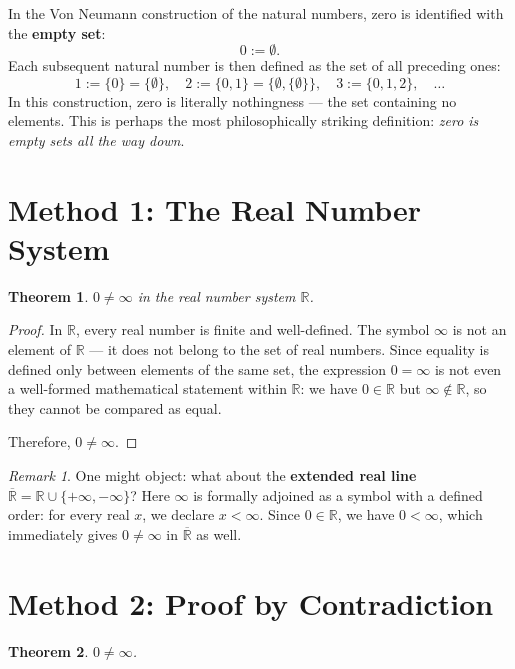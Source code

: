 \documentclass[12pt, a4paper]{article}
\newtheorem{theorem}{Theorem}
\theoremstyle{definition}
\theoremstyle{remark}
\newtheorem*{remark}{Remark}
\begin{document}
In the Von Neumann construction of the natural numbers, zero is identified with the \textbf{empty set}:
\[
0 := \emptyset.
\]
Each subsequent natural number is then defined as the set of all preceding ones:
\[
1 := \{0\} = \{\emptyset\},\quad 2 := \{0,1\} = \{\emptyset, \{\emptyset\}\},\quad 3 := \{0,1,2\},\quad \ldots
\]
In this construction, zero is literally nothingness — the set containing no elements. This is perhaps the most philosophically striking definition: \emph{zero is empty sets all the way down}.

\section{Method 1: The Real Number System}

\begin{theorem}
$0 \neq \infty$ in the real number system $\mathbb{R}$.
\end{theorem}

\begin{proof}
In $\mathbb{R}$, every real number is finite and well-defined. The symbol $\infty$ is not an element of $\mathbb{R}$ — it does not belong to the set of real numbers. Since equality is defined only between elements of the same set, the expression $0 = \infty$ is not even a well-formed mathematical statement within $\mathbb{R}$: we have $0 \in \mathbb{R}$ but $\infty \notin \mathbb{R}$, so they cannot be compared as equal.

Therefore, $0 \neq \infty$.
\end{proof}

\begin{remark}
One might object: what about the \textbf{extended real line} $\overline{\mathbb{R}} = \mathbb{R} \cup \{+\infty, -\infty\}$? Here $\infty$ is formally adjoined as a symbol with a defined order: for every real $x$, we declare $x < \infty$. Since $0 \in \mathbb{R}$, we have $0 < \infty$, which immediately gives $0 \neq \infty$ in $\overline{\mathbb{R}}$ as well.
\end{remark}

\section{Method 2: Proof by Contradiction}

\begin{theorem}
$0 \neq \infty$.
\end{theorem}
\end{document}
